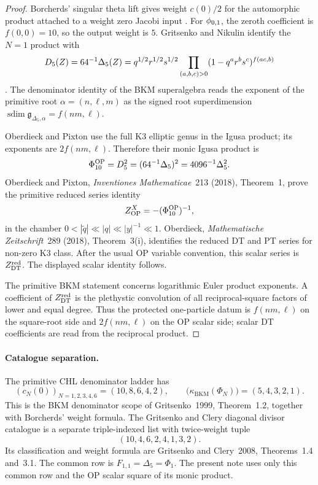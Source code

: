 \begin{proof}
Borcherds' singular theta lift gives weight \(c(0)/2\) for the
automorphic product attached to a weight zero Jacobi input
\cite[Theorem~13.3]{Borcherds1998}.  For \(\phi_{0,1}\), the zeroth
coefficient is \(f(0,0)=10\), so the output weight is \(5\).
Gritsenko and Nikulin identify the \(N=1\) product with
\[
  D_5(Z)=64^{-1}\Delta_5(Z)
  =
  q^{1/2}r^{1/2}s^{1/2}
  \prod_{(a,b,c)>0}(1-q^ar^b s^c)^{f(ac,b)}
\]
\cite[Theorem~2.1]{GritsenkoNikulin1998}.  The denominator identity of
the BKM superalgebra reads the exponent of the primitive root
\(\alpha=(n,\ell,m)\) as the signed root superdimension
\(\operatorname{sdim}\mathfrak g_{\Delta_5,\alpha}=f(nm,\ell)\).

Oberdieck and Pixton use the full K3 elliptic genus in the Igusa
product; its exponents are \(2f(nm,\ell)\).  Therefore their monic
Igusa product is
\[
  \Phi_{10}^{\mathrm{OP}}=D_5^2=(64^{-1}\Delta_5)^2=4096^{-1}\Delta_5^2.
\]
Oberdieck and Pixton, \emph{Inventiones Mathematicae}~213 (2018),
Theorem~1, prove the primitive reduced series identity
\[
  Z^X_{\mathrm{OP}}=-(\Phi_{10}^{\mathrm{OP}})^{-1},
\]
in the chamber \(0<|\tilde q|\ll |q|\ll |y|^{-1}\ll1\).  Oberdieck,
\emph{Mathematische Zeitschrift}~289 (2018), Theorem~3(i), identifies
the reduced DT and PT series for non-zero K3 class.  After the usual OP
variable convention, this scalar series is \(Z^{\mathrm{red}}_{\mathrm{DT}}\).  The displayed
scalar identity follows.

The primitive BKM statement concerns logarithmic Euler product
exponents.  A coefficient of \(Z^{\mathrm{red}}_{\mathrm{DT}}\) is the plethystic convolution
of all reciprocal-square factors of lower and equal degree.  Thus the
protected one-particle datum is \(f(nm,\ell)\) on the square-root side
and \(2f(nm,\ell)\) on the OP scalar side; scalar DT coefficients are
read from the reciprocal product.
\end{proof}

\paragraph{Catalogue separation.}
The primitive CHL denominator ladder has
\[
  (c_N(0))_{N=1,2,3,4,6}=(10,8,6,4,2),
  \qquad
  \bigl(\kappa_{\mathrm{BKM}}(\Phi_N)\bigr)=(5,4,3,2,1).
\]
This is the BKM denominator scope of Gritsenko~1999, Theorem~1.2,
together with Borcherds' weight formula.
The Gritsenko and Clery diagonal divisor catalogue is a separate
triple-indexed list with twice-weight tuple
\[
  (10,4,6,2,4,1,3,2).
\]
Its classification and weight formula are Gritsenko and Clery~2008,
Theorems~1.4 and~3.1.
The common row is \(F_{1,1}=\Delta_5=\Phi_1\).  The present note uses
only this common row and the OP scalar square of its monic product.

